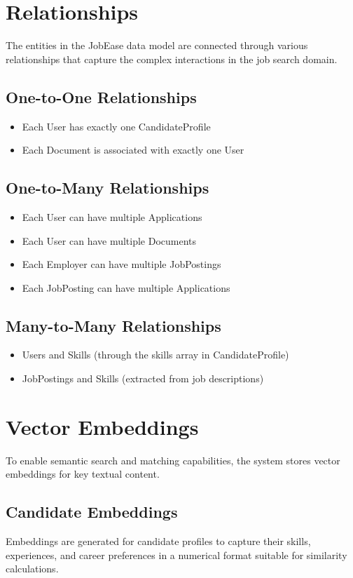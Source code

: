 \documentclass[12pt,a4paper]{report}
\begin{document}
\section{Relationships}
The entities in the JobEase data model are connected through various relationships that capture the complex interactions in the job search domain.

\subsection{One-to-One Relationships}
\begin{itemize}[leftmargin=2em]
  \item Each User has exactly one CandidateProfile
  \item Each Document is associated with exactly one User
\end{itemize}

\subsection{One-to-Many Relationships}
\begin{itemize}[leftmargin=2em]
  \item Each User can have multiple Applications
  \item Each User can have multiple Documents
  \item Each Employer can have multiple JobPostings
  \item Each JobPosting can have multiple Applications
\end{itemize}

\subsection{Many-to-Many Relationships}
\begin{itemize}[leftmargin=2em]
  \item Users and Skills (through the skills array in CandidateProfile)
  \item JobPostings and Skills (extracted from job descriptions)
\end{itemize}

\section{Vector Embeddings}
To enable semantic search and matching capabilities, the system stores vector embeddings for key textual content.

\subsection{Candidate Embeddings}
Embeddings are generated for candidate profiles to capture their skills, experiences, and career preferences in a numerical format suitable for similarity calculations.
\end{document}
